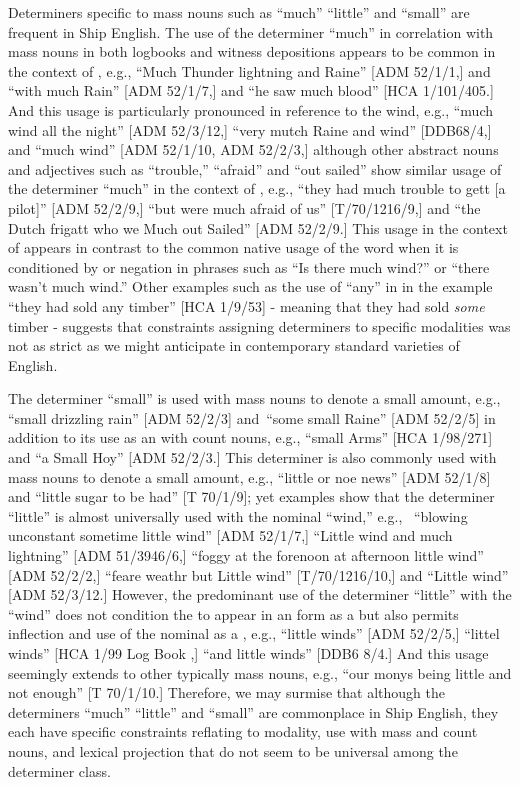 Determiners specific to mass nouns such as “much” “little” and “small” are frequent in Ship English. The use of the determiner “much” in correlation with mass nouns in both logbooks and witness depositions appears to be common in the context of , e.g., “Much Thunder lightning and Raine” [ADM 52/1/1,] and “with much Rain” [ADM 52/1/7,] and “he saw much blood” [HCA 1/101/405.] And this usage is particularly pronounced in reference to the wind, e.g., “much wind all the night” [ADM 52/3/12,] “very mutch Raine and wind” [DDB68/4,] and “much wind” [ADM 52/1/10, ADM 52/2/3,] although other abstract nouns and adjectives such as “trouble,” “afraid” and “out sailed” show similar usage of the determiner “much” in the context of , e.g., “they had much trouble to gett [a pilot]” [ADM 52/2/9,] “but were much afraid of us” [T/70/1216/9,] and “the Dutch frigatt who we Much out Sailed” [ADM 52/2/9.] This usage in the context of  appears in contrast to the common native usage of the word when it is conditioned by  or negation in phrases such as “Is there much wind?” or “there wasn’t much wind.” Other examples such as the use of “any” in  in the example “they had sold any timber” [HCA 1/9/53] - meaning that they had sold \textit{some} timber - suggests that constraints assigning determiners to specific modalities was not as strict as we might anticipate in contemporary standard varieties of English.  

The determiner “small” is used with  mass nouns to denote a small amount, e.g., “small drizzling rain” [ADM 52/2/3] and~“some small Raine” [ADM 52/2/5] in addition to its use as an  with count nouns, e.g., “small Arms” [HCA 1/98/271] and “a Small Hoy” [ADM 52/2/3.] This determiner is also commonly used with  mass nouns to denote a small amount, e.g., “little or noe news” [ADM 52/1/8] and “little sugar to be had” [T 70/1/9]; yet examples show that the determiner “little” is almost universally used with the nominal “wind,” e.g., ~“blowing unconstant sometime little wind” [ADM 52/1/7,] “Little wind and much lightning” [ADM 51/3946/6,] “foggy at the forenoon at afternoon little wind” [ADM 52/2/2,] “feare weathr but Little wind” [T/70/1216/10,] and “Little wind” [ADM 52/3/12.] However, the predominant use of the determiner “little” with the  “wind” does not condition the  to appear in an  form as a  but also permits inflection and use of the nominal as a , e.g., “little winds” [ADM 52/2/5,] “littel winds” [HCA 1/99 Log Book \citealt{Pideaux1731},] “and little winds” [DDB6 8/4.] And this usage seemingly extends to other typically mass nouns, e.g., “our monys being little and not enough” [T 70/1/10.] Therefore, we may surmise that although the determiners “much” “little” and “small” are commonplace in Ship English, they each have specific constraints reflating to modality, use with mass and count nouns, and lexical projection that do not seem to be universal among the determiner class.  

